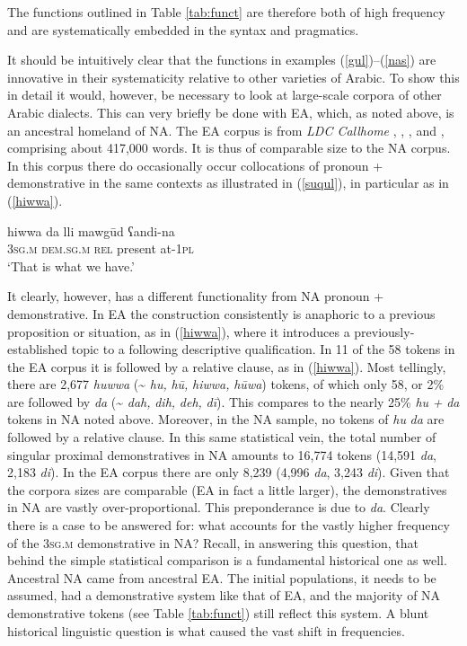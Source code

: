 \documentclass[output=paper]{langsci/langscibook}
\begin{document}
The functions outlined in Table \ref{tab:funct} are therefore both of high frequency and are systematically embedded in the syntax and pragmatics.

It should be intuitively clear that the functions in examples (\ref{gul})–(\ref{nas}) are innovative in their systematicity relative to other varieties of Arabic. To show this in detail it would, however, be necessary to look at large-scale corpora of other Arabic dialects. This can very briefly be done with EA, which, as noted above, is an ancestral homeland of NA. The EA corpus is from \textit{LDC Callhome} \citep{Canavanetal1997}, \citet{Nakano1982}, \citet{BehnstedtWoidich1987}, and \citet{WoidichDrop2007}, comprising about 417,000 words. It is thus of comparable size to the NA corpus. In this corpus there do occasionally occur collocations of pronoun + demonstrative in the same contexts as illustrated in (\ref{suqul}), in particular as in (\ref{hiwwa}). 

\ea\label{hiwwa} 
\gll hiwwa da lli mawgūd ʕandi-na\\
     \textsc{3sg.m} \textsc{dem.sg.m} \textsc{rel} present at-1\textsc{pl}\\
\glt ‘That is what we have.’
\z

It clearly, however, has a different functionality from NA pronoun + demonstrative. In EA the construction consistently is anaphoric to a previous proposition or situation, as in (\ref{hiwwa}), where it introduces a previously-established topic to a following descriptive qualification. In 11 of the 58 tokens in the EA corpus it is followed by a relative clause, as in (\ref{hiwwa}). Most tellingly, there are 2,677 \textit{huwwa} ({\textasciitilde} \textit{hu,} \textit{hū,} \textit{hiwwa,} \textit{hūwa}) tokens, of which only 58, or 2\% are followed by \textit{da} ({\textasciitilde} \textit{dah,} \textit{dih,} \textit{deh,} \textit{dī}). This compares to the nearly 25\% \textit{hu} \textit{+} \textit{da} tokens in NA noted above. Moreover, in the NA sample, no tokens of \textit{hu} \textit{da} are followed by a relative clause. In this same statistical vein, the total number of singular proximal demonstratives in NA amounts to 16,774 tokens (14,591 \textit{da}, 2,183 \textit{di}). In the EA corpus there are only 8,239 (4,996 \textit{da}, 3,243 \textit{di}). Given that the corpora sizes are comparable (EA in fact a little larger), the demonstratives in NA are vastly over-proportional. This preponderance is due to \textit{da}. Clearly there is a case to be answered for: what accounts for the vastly higher frequency of the 3\textsc{sg.m} demonstrative in NA? Recall, in answering this question, that behind the simple statistical comparison is a fundamental historical one as well. Ancestral NA came from ancestral EA. The initial populations, it needs to be assumed, had a demonstrative system like that of EA, and the majority of NA demonstrative tokens (see Table \ref{tab:funct}) still reflect this system. A blunt historical linguistic question is what caused the vast shift in frequencies.
\end{document}

